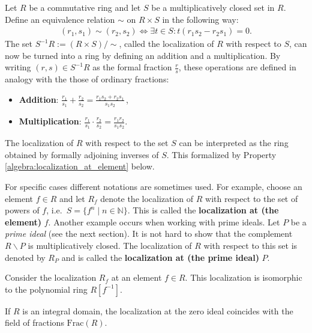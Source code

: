     \begin{construct}[Localization]
        Let $R$ be a commutative ring and let $S$ be a multiplicatively closed set in $R$. Define an equivalence relation $\sim$ on $R\times S$ in the following way:
        \begin{gather}
            (r_1,s_1)\sim(r_2,s_2) \iff \exists t\in S:t(r_1s_2 - r_2s_1) = 0.
        \end{gather}
        The set $S^{-1}R:=(R\times S)/\sim$, called the localization of $R$ with respect to $S$, can now be turned into a ring by defining an addition and a multiplication. By writing $(r,s)\in S^{-1}R$ as the formal fraction $\frac{r}{s}$, these operations are defined in analogy with the those of ordinary fractions:
        \begin{itemize}
            \item\textbf{Addition}: $\displaystyle\frac{r_1}{s_1} + \frac{r_2}{s_2} = \frac{r_1s_2 + r_2s_1}{s_1s_2}$\,,
            \item\textbf{Multiplication}: $\displaystyle\frac{r_1}{s_1}\cdot\frac{r_2}{s_2} = \frac{r_1r_2}{s_1s_2}$.
        \end{itemize}
    \end{construct}
    \begin{remark}
        The localization of $R$ with respect to the set $S$ can be interpreted as the ring obtained by formally adjoining inverses of $S$. This formalized by Property \ref{algebra:localization_at_element} below.
    \end{remark}

    \begin{notation}\label{algebra:localization_notation}
        For specific cases different notations are sometimes used. For example, choose an element $f\in R$ and let $R_f$ denote the localization of $R$ with respect to the set of powers of $f$, i.e.~$S=\{f^n\mid n\in\mathbb{N}\}$. This is called the \textbf{localization at (the element)} $f$. Another example occurs when working with prime ideals. Let $P$ be a \textit{prime ideal} (see the next section). It is not hard to show that the complement $R\backslash P$ is multiplicatively closed. The localization of $R$ with respect to this set is denoted by $R_P$ and is called the \textbf{localization at (the prime ideal)} $P$.
    \end{notation}

    \begin{property}\label{algebra:localization_at_element}
        Consider the localization $R_f$ at an element $f\in R$. This localization is isomorphic to the polynomial ring $R[f^{-1}]$.
    \end{property}
    \begin{property}
        If $R$ is an integral domain, the localization at the zero ideal coincides with the field of fractions $\mathrm{Frac}(R)$.
    \end{property}

